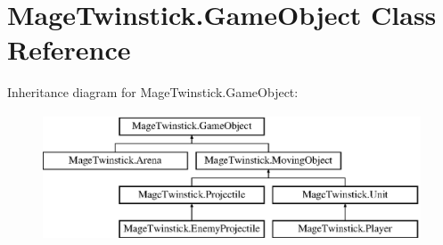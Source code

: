 \hypertarget{class_mage_twinstick_1_1_game_object}{}\section{Mage\+Twinstick.\+Game\+Object Class Reference}
\label{class_mage_twinstick_1_1_game_object}
Inheritance diagram for Mage\+Twinstick.\+Game\+Object\+:\begin{figure}[H]
\begin{center}
\leavevmode
\includegraphics[height=3.771044cm]{class_mage_twinstick_1_1_game_object}
\end{center}
\end{figure}
